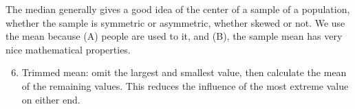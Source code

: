 \documentclass[../Notes.tex]{subfiles}
\begin{document}
    The median generally gives a good idea of the center of a sample of a population, whether the sample is symmetric or asymmetric, whether skewed or not. We use the mean because (A) people are used to it, and (B), the sample mean has very nice mathematical properties.

    \begin{enumerate}
        \setcounter{enumi}{5}
        \item Trimmed mean: omit the largest and smallest value, then calculate the mean of the remaining values. This reduces the influence of the most extreme value on either end.
    \end{enumerate}
\end{document}

